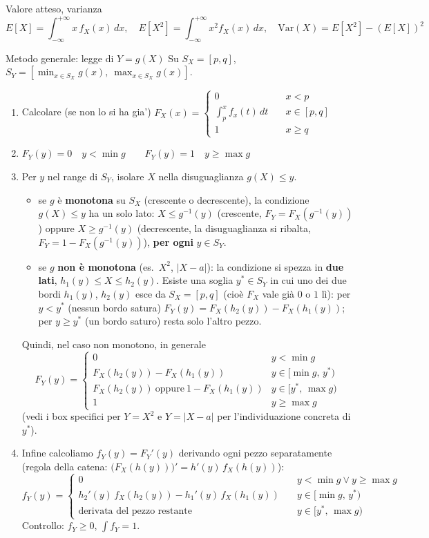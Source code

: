\documentclass[11pt]{article}
\begin{document}
\begin{concetto}[barGreen]{Valore atteso, varianza}
\[ E[X] = \int_{-\infty}^{+\infty} x\,f_X(x)\,dx, \quad E[X^2] = \int_{-\infty}^{+\infty} x^2 f_X(x)\,dx, \quad \mathrm{Var}(X) = E[X^2]-(E[X])^2 \]
\end{concetto}

\begin{concetto}[barGreen]{Metodo generale: legge di $Y=g(X)$}
Su $S_X=[p,q]$, $S_Y=[\min_{x\in S_X} g(x),\ \max_{x\in S_X} g(x)]$.
\begin{enumerate}
\item Calcolare (se non lo si ha gia') $F_X(x) =  \begin{cases}
0 \quad & x < p \\
\int_{p}^x f_x(t) \, dt \quad & x \in [p,q]\\
1 \quad & x \geq q
  \end{cases}$
\item $F_Y(y)=0 \quad y < \min g \qquad F_Y(y)=1 \quad y \geq \max g$
\item Per $y$ nel range di $S_Y$, isolare $X$ nella disuguaglianza $g(X)\le y$.
\begin{itemize}
\item se $g$ \`e \textbf{monotona} su $S_X$ (crescente o decrescente), la condizione $g(X)\le y$ ha un solo lato: $X\le g^{-1}(y)$ (crescente, $F_Y=F_X(g^{-1}(y))$) oppure $X\ge g^{-1}(y)$ (decrescente, la disuguaglianza si ribalta, $F_Y=1-F_X(g^{-1}(y))$), \textbf{per ogni} $y\in S_Y$.
\item se $g$ \textbf{non \`e monotona} (es.\ $X^2$, $|X-a|$): la condizione si spezza in \textbf{due lati}, $h_1(y)\le X\le h_2(y)$. Esiste una soglia $y^*\in S_Y$ in cui uno dei due bordi $h_1(y)$, $h_2(y)$ esce da $S_X=[p,q]$ (cio\`e $F_X$ vale gi\`a $0$ o $1$ l\`i): per $y<y^*$ (nessun bordo satura) $F_Y(y)=F_X(h_2(y))-F_X(h_1(y))$; per $y\ge y^*$ (un bordo saturo) resta solo l'altro pezzo.
\end{itemize}
Quindi, nel caso non monotono, in generale
\[ F_Y(y)= \begin{cases}
0 & y < \min g\\
F_X(h_2(y))-F_X(h_1(y)) & y\in[\min g,\, y^*)\\
F_X(h_2(y))\ \text{oppure}\ 1-F_X(h_1(y)) & y\in[y^*,\, \max g)\\
1 & y \geq \max g
\end{cases} \]
(vedi i box specifici per $Y=X^2$ e $Y=|X-a|$ per l'individuazione concreta di $y^*$).
\item Infine calcoliamo $f_Y(y)=F_Y'(y)$ derivando ogni pezzo separatamente (regola della catena: $\big(F_X(h(y))\big)'=h'(y)\,f_X(h(y))$):
\[ f_Y(y) = \begin{cases}
0 \quad & y < \min g \lor y \geq \max g\\
h_2'(y)\,f_X(h_2(y)) - h_1'(y)\,f_X(h_1(y)) \quad & y \in [\min g,\, y^*)\\
\text{derivata del pezzo restante} \quad & y \in [y^*,\, \max g)
\end{cases} \]
Controllo: $f_Y\ge0$, $\int f_Y=1$.
\end{enumerate}
\end{concetto}
\end{document}
